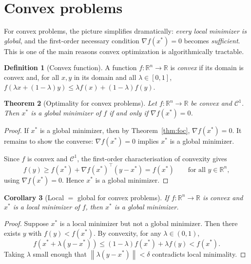 \documentclass[11pt,a4paper]{report}
\theoremstyle{plain}
\newtheorem{theorem}{Theorem}[chapter]
\newtheorem{corollary}[theorem]{Corollary}
\theoremstyle{definition}
\newtheorem{definition}[theorem]{Definition}
\newcommand{\R}{\mathbb{R}}
\newcommand{\norm}[1]{\left\lVert#1\right\rVert}
\newcommand{\grad}{\nabla}
\newcommand{\trans}{^{\top}}
\begin{document}
\section{Convex problems}

For convex problems, the picture simplifies dramatically: \emph{every local
minimizer is global}, and the first-order necessary condition $\grad f(x^{*})=0$
becomes \emph{sufficient}. This is one of the main reasons convex optimization is
algorithmically tractable.

\begin{definition}[Convex function]
A function $f:\R^{n}\to\R$ is \emph{convex} if its domain is convex and, for all
$x,y$ in its domain and all $\lambda\in[0,1]$,
$f(\lambda x+(1-\lambda)y)\le \lambda f(x)+(1-\lambda)f(y)$.
\end{definition}

\begin{theorem}[Optimality for convex problems]\label{thm:convex-opt}
Let $f:\R^{n}\to\R$ be convex and $\mathcal{C}^{1}$. Then $x^{*}$ is a global
minimizer of $f$ if and only if $\grad f(x^{*})=0$.
\end{theorem}
\begin{proof}
  If $x^{*}$ is a global minimizer, then by Theorem~\ref{thm:foc}, $\grad f(x^{*})=0$. It remains to show the converse: $\grad f(x^{*})=0$ implies $x^{*}$ is a global minimizer.

  Since $f$ is convex and $\mathcal{C}^{1}$, the first-order characterisation of convexity gives
  \[
    f(y)\ge f(x^{*})+\grad f(x^{*})\trans(y-x^{*})=f(x^{*})
    \qquad\text{for all }y\in\R^{n},
  \]
  using $\grad f(x^{*})=0$. Hence $x^{*}$ is a global minimizer.
\end{proof}

\begin{corollary}[Local $=$ global for convex problems]\label{cor:convex-local-global}
If $f:\R^{n}\to\R$ is convex and $x^{*}$ is a local minimizer of $f$, then $x^{*}$ is a global minimizer.
\end{corollary}
\begin{proof}
  Suppose $x^{*}$ is a local minimizer but not a global minimizer. Then there exists $y$ with $f(y)<f(x^{*})$. By convexity, for any $\lambda\in(0,1)$,
  \[
    f(x^{*}+\lambda(y-x^{*}))\le (1-\lambda)f(x^{*})+\lambda f(y)<f(x^{*}).
  \]
  Taking $\lambda$ small enough that $\norm{\lambda(y-x^{*})}<\delta$ contradicts local minimality.
\end{proof}
\end{document}
